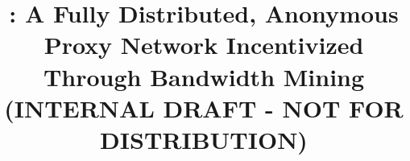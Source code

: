 \usepackage{draftwatermark}

\title{\Orchid{}: A Fully Distributed, Anonymous Proxy Network Incentivized Through Bandwidth Mining \\ (INTERNAL DRAFT - NOT FOR DISTRIBUTION)}
